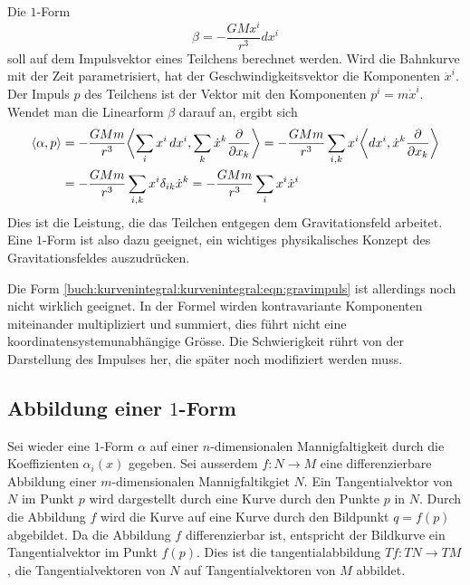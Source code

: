 \begin{beispiel}
Die $1$-Form
\[
\beta
=
-
\frac{GMx^i}{r^3}
dx^i
\]
soll auf dem Impulsvektor eines Teilchens berechnet werden.
Wird die Bahnkurve mit der Zeit parametrisiert, hat der Geschwindigkeitsvektor
die Komponenten $\dot{x}^i$.
Der Impuls $p$ des Teilchens ist der Vektor mit den Komponenten
$p^i=m\dot{x}^i$.
Wendet man die Linearform $\beta$ darauf an, ergibt sich
\begin{align*}
\langle \alpha, p\rangle
&=
-
\frac{GMm}{r^3}
\biggl\langle \sum_i x^i\,dx^i, \sum_k\dot{x}^k\frac{\partial}{\partial x_k}\biggr\rangle
=
-
\frac{GMm}{r^3}
\sum_{i,k} x^i \biggl\langle dx^i,\dot{x}^k\frac{\partial}{\partial x_k}\biggr\rangle
\notag
\\
&=
-
\frac{GMm}{r^3}
\sum_{i,k}
x^i \delta_{ik} \dot{x}^k
=
-\frac{GMm}{r^3}
\sum_i x^i\dot{x}^i
\label{buch:kurvenintegral:kurvenintegral:eqn:gravimpuls}
\end{align*}
Dies ist die Leistung, die das Teilchen entgegen dem Gravitationsfeld 
arbeitet.
Eine $1$-Form ist also dazu geeignet, ein wichtiges physikalisches Konzept
des Gravitationsfeldes auszudrücken.

Die Form
\eqref{buch:kurvenintegral:kurvenintegral:eqn:gravimpuls}
ist allerdings noch nicht wirklich geeignet.
In der Formel wirden kontravariante Komponenten miteinander multipliziert
und summiert, dies führt nicht eine koordinatensystemunabhängige
Grösse.
Die Schwierigkeit rührt von der Darstellung des Impulses her, die später
noch modifiziert werden muss.
\end{beispiel}

%
%
\subsection{Abbildung einer $1$-Form}
Sei wieder eine $1$-Form $\alpha$ auf einer $n$-dimensionalen Mannigfaltigkeit
durch die Koeffizienten $\alpha_i(x)$ gegeben.
Sei ausserdem $f\colon N\to M$ eine differenzierbare Abbildung einer
$m$-dimensionalen Mannigfaltikgiet $N$.
Ein Tangentialvektor von $N$ im Punkt $p$ wird dargestellt durch eine
Kurve durch den Punkte $p$ in $N$.
Durch die Abbildung $f$ wird die Kurve auf eine Kurve durch den Bildpunkt
$q=f(p)$ abgebildet.
Da die Abbildung $f$ differenzierbar ist, entspricht der Bildkurve 
ein Tangentialvektor im Punkt $f(p)$.
Dies ist die tangentialabbildung $Tf\colon TN\to TM$, die Tangentialvektoren
von $N$ auf Tangentialvektoren von $M$ abbildet.

